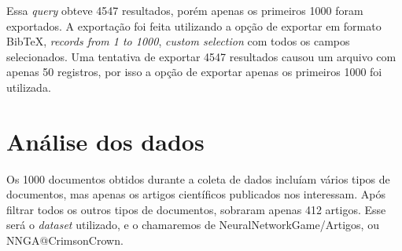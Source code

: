 Essa \textit{query} obteve 4547 resultados, porém apenas os primeiros 1000 foram exportados. A exportação foi feita utilizando a opção de exportar em formato BibTeX, \textit{records from 1 to 1000}, \textit{custom selection} com todos os campos selecionados. Uma tentativa de exportar 4547 resultados causou um arquivo com apenas 50 registros, por isso a opção de exportar apenas os primeiros 1000 foi utilizada.

\section{Análise dos dados}
Os 1000 documentos obtidos durante a coleta de dados incluíam vários tipos de documentos, mas apenas os artigos científicos publicados nos interessam. Após filtrar todos os outros tipos de documentos, sobraram apenas 412 artigos. Esse será o \textit{dataset} utilizado, e o chamaremos de NeuralNetworkGame/Artigos, ou NNGA@CrimsonCrown.

